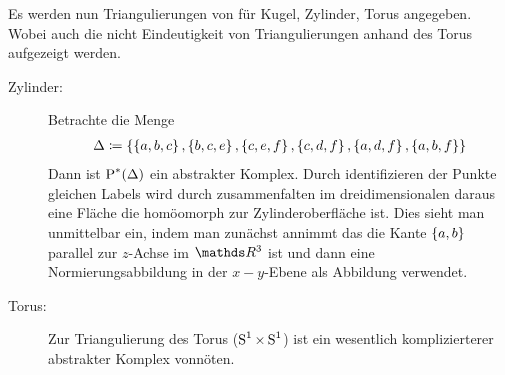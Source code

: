\begin{Bsp}[Triangulation]
  Es werden nun Triangulierungen von für Kugel, Zylinder, Torus angegeben.
  Wobei auch die nicht Eindeutigkeit von Triangulierungen anhand des Torus
  aufgezeigt werden.

  \begin{description}
  \item[Zylinder:] Betrachte die Menge
    \begin{gather*}
      \Delta \coloneqq
      \sset{\sset{a,b,c},\sset{b,c,e},\sset{c,e,f},\sset{c,d,f}%
        ,\sset{a,d,f},\sset{a,b,f}}
    \end{gather*}
    Dann ist $\operatorname{P}^*(\Delta)$ ein abstrakter Komplex.  Durch
    identifizieren der Punkte gleichen Labels wird durch
    zusammenfalten im dreidimensionalen daraus eine Fläche die
    homöomorph zur Zylinderoberfläche ist. Dies sieht man unmittelbar
    ein, indem man zunächst annimmt das die Kante $\left\{ a,b \right\}$
    parallel zur $z$-Achse im $\R^3$ ist und dann eine
    Normierungsabbildung in der $x-y$-Ebene als Abbildung verwendet.
    \newline
  \begin{center}
      \parbox{0.7\linewidth}{%
      \hfill
      }
    \end{center}
  \item[Torus:] Zur Triangulierung des Torus ($\operatorname{S}^1 \times \operatorname{S}^1$)
    ist ein wesentlich komplizierterer abstrakter Komplex
    vonnöten.


\end{description}
\end{Bsp}
